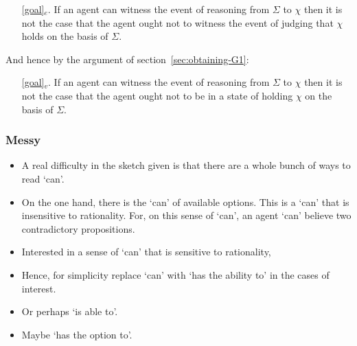 \documentclass[10pt]{article}
\begin{document}
\begin{enumerate}[label=G\arabic*., ref=G\arabic*]
\item[\ref{goal}\(_{e}\).] If an agent can witness the event of reasoning from \(\Sigma\) to \(\chi\) then it is not the case that the agent ought not to witness the event of judging that \(\chi\) holds on the basis of \(\Sigma\).
\end{enumerate}

And hence by the argument of section~\ref{sec:obtaining-G1}:

\begin{enumerate}[label=G\arabic*., ref=G\arabic*]
\item[\ref{goal}\(_{v}\).] If an agent can witness the event of reasoning from \(\Sigma\) to \(\chi\) then it is not the case that the agent ought not to be in a state of holding \(\chi\) on the basis of \(\Sigma\).
\end{enumerate}


\subsubsection{Messy}
\label{sec:messy}

\begin{itemize}
\item A real difficulty in the sketch given is that there are a whole bunch of ways to read `can'.
\item On the one hand, there is the `can' of available options.
  This is a `can' that is insensitive to rationality.
  For, on this sense of `can', an agent `can' believe two contradictory propositions.
\item Interested in a sense of `can' that is sensitive to rationality, 
\item Hence, for simplicity replace `can' with `has the ability to' in the cases of interest.
\item Or perhaps `is able to'.
\item Maybe `has the option to'.
\end{itemize}
\end{document}

